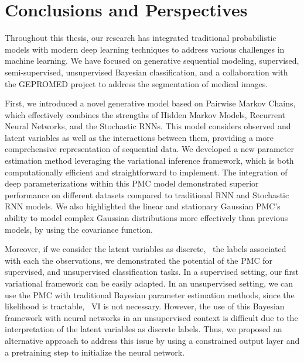 \chapter*{Conclusions and Perspectives}



Throughout this thesis, our research has integrated traditional
probabilistic models with modern deep learning techniques to address 
various challenges in machine learning. We have focused on generative
sequential modeling, supervised, semi-supervised, 
unsupervised Bayesian classification, and a collaboration with the GEPROMED project
to address the segmentation of medical images.
\vspace{0.27cm}

First, we introduced a novel generative model based on Pairwise Markov Chains,
which effectively combines the strengths of Hidden Markov Models,
Recurrent Neural Networks, and the Stochastic RNNs.
This model considers  observed and latent variables as well as the
interactions between them, providing a more comprehensive representation of
sequential data. 
We developed a new parameter estimation method leveraging the variational inference
framework, which is both computationally efficient and straightforward to
implement. The integration of deep parameterizations within this PMC
model demonstrated superior performance on different 
datasets compared to traditional RNN and Stochastic RNN models.
We also highlighted the linear and stationary Gaussian PMC's ability to model complex
Gaussian distributions more effectively than previous models,  
by using the covariance function. 
\vspace{0.27cm}





Moreover, if we consider the latent variables as discrete, \ie~the labels
associated with each the observations,
we demonstrated the potential of the PMC for supervised, and unsupervised 
classification tasks. In a supervised setting, our first variational framework can 
be easily adapted. In an unsupervised setting, we can use the PMC with traditional
Bayesian parameter estimation methods, since the likelihood is tractable, 
\ie~VI is not necessary. However, the use of this Bayesian framework with neural 
networks in an unsupervised context is difficult due to the interpretation of the
latent variables as discrete labels. Thus, we proposed an alternative 
approach to address this issue by using a constrained output layer 
and a pretraining step to initialize the neural network.
\vspace{0.27cm}



